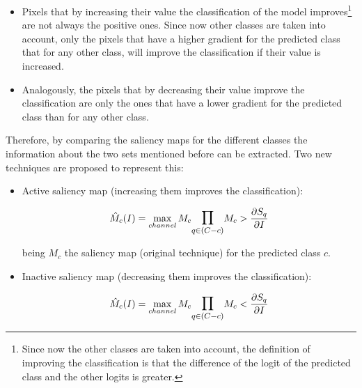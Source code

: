 \documentclass[preprint,12pt]{elsarticle}
\begin{document}
\begin{itemize}
    \item Pixels that by increasing their value the classification of the model improves\footnote{Since now the other classes are taken into account, the definition of improving the classification is that the difference of the logit of the predicted class and the other logits is greater.} are not always the positive ones. Since now other classes are taken into account, only the pixels that have a higher gradient for the predicted class that for any other class, will improve the classification if their value is increased.
    \item Analogously, the pixels that by decreasing their value improve the classification are only the ones that have a lower gradient for the predicted class than for any other class.
\end{itemize}

Therefore, by comparing the saliency maps for the different classes the information about the two sets mentioned before can be extracted. Two new techniques are proposed to represent this:

\begin{itemize}
    \item Active saliency map (increasing them improves the classification):
    
    \begin{equation}
        \label{eq: active saliency map}
        \hat{M}_c(I) = \max_{channel} M_c \mathlarger{\mathlarger{\prod}}_{q \in (C-c)}M_c > \frac{\partial S_q}{\partial I}
    \end{equation}

    being $M_c$ the saliency map (original technique) for the predicted class $c$.

    \item Inactive saliency map (decreasing them improves the classification):
    
    \begin{equation}
        \label{eq: inactive saliency map}
        \hat{M}_c(I) = \max_{channel} M_c \mathlarger{\mathlarger{\prod}}_{q \in (C-c)}M_c < \frac{\partial S_q}{\partial I}
    \end{equation}

\end{itemize}
\end{document}
